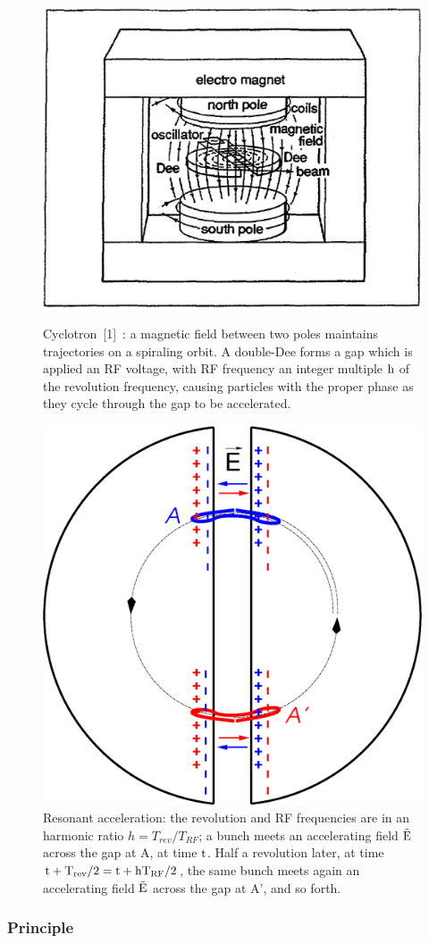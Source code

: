 \begin{figure}[ht]
\centering
\sidebyside
{
    \includegraphics[width=0.45\linewidth]{./figs_cyclo/LBLCycloSketch.eps}
    \caption{\label{FigLBLCycloSketch}
Cyclotron~[1]~: a magnetic field between 
two poles maintains trajectories on a spiraling orbit. A double-Dee  forms a gap which is applied an RF voltage, 
with RF frequency an integer multiple $\rm h$ of the revolution frequency, 
 causing particles with the proper phase as they cycle through the gap to be accelerated.} %
}{
    \includegraphics[width=0.38\linewidth]{./figs_cyclo/dees.eps}
    \caption{  \label{FigPSICyclo}
Resonant acceleration: 
the revolution and RF frequencies are in an harmonic ratio $h=T_{rev}/ T_{RF}$; 
a bunch meets an accelerating field $\rm \vec E$ across the gap at A, at time $\rm t$. 
Half a revolution later, at time  $\rm t +T_{rev}/2 = t + h T_{RF}/2$,  the same bunch meets again 
an accelerating field $\rm \vec E$ across the gap at A', and so forth. 
}
}
\end{figure}

\subsubsection*{Principle}

